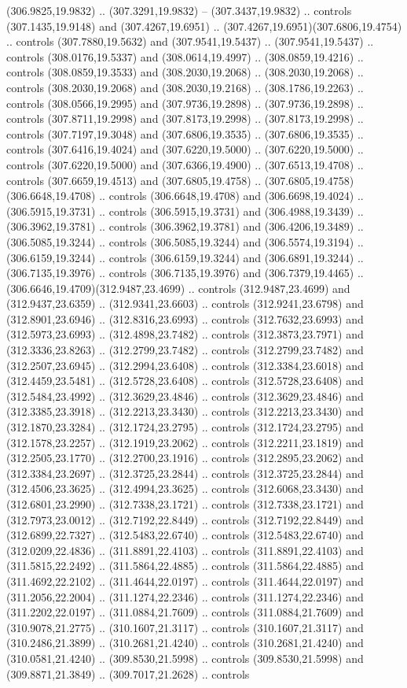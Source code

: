 (306.9825,19.9832) .. (307.3291,19.9832) -- (307.3437,19.9832) .. controls (307.1435,19.9148) and (307.4267,19.6951) .. (307.4267,19.6951)(307.6806,19.4754) .. controls (307.7880,19.5632) and (307.9541,19.5437) .. (307.9541,19.5437) .. controls (308.0176,19.5337) and (308.0614,19.4997) .. (308.0859,19.4216) .. controls (308.0859,19.3533) and (308.2030,19.2068) .. (308.2030,19.2068) .. controls (308.2030,19.2068) and (308.2030,19.2168) .. (308.1786,19.2263) .. controls (308.0566,19.2995) and (307.9736,19.2898) .. (307.9736,19.2898) .. controls (307.8711,19.2998) and (307.8173,19.2998) .. (307.8173,19.2998) .. controls (307.7197,19.3048) and (307.6806,19.3535) .. (307.6806,19.3535) .. controls (307.6416,19.4024) and (307.6220,19.5000) .. (307.6220,19.5000) .. controls (307.6220,19.5000) and (307.6366,19.4900) .. (307.6513,19.4708) .. controls (307.6659,19.4513) and (307.6805,19.4758) .. (307.6805,19.4758)(306.6648,19.4708) .. controls (306.6648,19.4708) and (306.6698,19.4024) .. (306.5915,19.3731) .. controls (306.5915,19.3731) and (306.4988,19.3439) .. (306.3962,19.3781) .. controls (306.3962,19.3781) and (306.4206,19.3489) .. (306.5085,19.3244) .. controls (306.5085,19.3244) and (306.5574,19.3194) .. (306.6159,19.3244) .. controls (306.6159,19.3244) and (306.6891,19.3244) .. (306.7135,19.3976) .. controls (306.7135,19.3976) and (306.7379,19.4465) .. (306.6646,19.4709)(312.9487,23.4699) .. controls (312.9487,23.4699) and (312.9437,23.6359) .. (312.9341,23.6603) .. controls (312.9241,23.6798) and (312.8901,23.6946) .. (312.8316,23.6993) .. controls (312.7632,23.6993) and (312.5973,23.6993) .. (312.4898,23.7482) .. controls (312.3873,23.7971) and (312.3336,23.8263) .. (312.2799,23.7482) .. controls (312.2799,23.7482) and (312.2507,23.6945) .. (312.2994,23.6408) .. controls (312.3384,23.6018) and (312.4459,23.5481) .. (312.5728,23.6408) .. controls (312.5728,23.6408) and (312.5484,23.4992) .. (312.3629,23.4846) .. controls (312.3629,23.4846) and (312.3385,23.3918) .. (312.2213,23.3430) .. controls (312.2213,23.3430) and (312.1870,23.3284) .. (312.1724,23.2795) .. controls (312.1724,23.2795) and (312.1578,23.2257) .. (312.1919,23.2062) .. controls (312.2211,23.1819) and (312.2505,23.1770) .. (312.2700,23.1916) .. controls (312.2895,23.2062) and (312.3384,23.2697) .. (312.3725,23.2844) .. controls (312.3725,23.2844) and (312.4506,23.3625) .. (312.4994,23.3625) .. controls (312.6068,23.3430) and (312.6801,23.2990) .. (312.7338,23.1721) .. controls (312.7338,23.1721) and (312.7973,23.0012) .. (312.7192,22.8449) .. controls (312.7192,22.8449) and (312.6899,22.7327) .. (312.5483,22.6740) .. controls (312.5483,22.6740) and (312.0209,22.4836) .. (311.8891,22.4103) .. controls (311.8891,22.4103) and (311.5815,22.2492) .. (311.5864,22.4885) .. controls (311.5864,22.4885) and (311.4692,22.2102) .. (311.4644,22.0197) .. controls (311.4644,22.0197) and (311.2056,22.2004) .. (311.1274,22.2346) .. controls (311.1274,22.2346) and (311.2202,22.0197) .. (311.0884,21.7609) .. controls (311.0884,21.7609) and (310.9078,21.2775) .. (310.1607,21.3117) .. controls (310.1607,21.3117) and (310.2486,21.3899) .. (310.2681,21.4240) .. controls (310.2681,21.4240) and (310.0581,21.4240) .. (309.8530,21.5998) .. controls (309.8530,21.5998) and (309.8871,21.3849) .. (309.7017,21.2628) .. controls 